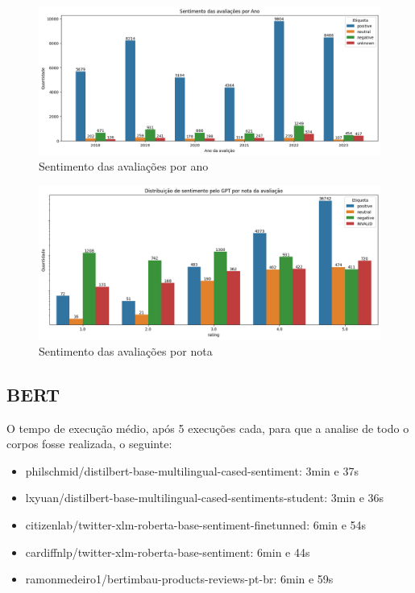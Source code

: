 \begin{figure}
	\centering
	\includegraphics[width=1\textwidth]{figs/gpt/sentimento_ano.png}
	\caption{Sentimento das avaliações por ano}
	\label{img:gpt_sentimento_ano}
\end{figure}

\begin{figure}
	\centering
	\includegraphics[width=1\textwidth]{figs/gpt/sentimento_nota.png}
	\caption{Sentimento das avaliações por nota}
	\label{img:gpt_sentimento_nota}
\end{figure}

\subsection[BERT]{BERT}
\label{sec:resultados:subsec:bert}

O tempo de execução médio, após 5 execuções cada, para que a analise de todo o corpos fosse realizada, o seguinte:

\begin{itemize}
	\item philschmid/distilbert-base-multilingual-cased-sentiment: 3min e 37s
	\item lxyuan/distilbert-base-multilingual-cased-sentiments-student: 3min e 36s
	\item citizenlab/twitter-xlm-roberta-base-sentiment-finetunned: 6min e 54s
	\item cardiffnlp/twitter-xlm-roberta-base-sentiment: 6min e 44s
	\item ramonmedeiro1/bertimbau-products-reviews-pt-br: 6min e 59s
\end{itemize}



